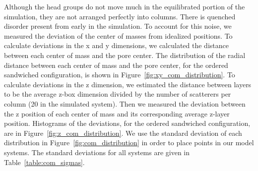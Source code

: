 \documentclass{article}
\begin{document}
  Although the head groups do not move much in the equilibrated portion of the
  simulation, they are not arranged perfectly into columns. There is quenched
  disorder present from early in the simulation. To account for this noise, we
  measured the deviation of the center of masses from idealized positions. To
  calculate deviations in the x and y dimensions, we calculated the distance
  between each center of mass and the pore center. The distribution of the radial
  distance between each center of mass and the pore center, for the ordered
  sandwiched configuration, is shown in Figure~\ref{fig:xy_com_distribution}. To
  calculate deviations in the z dimension, we estimated the distance between
  layers to be the average z-box dimension divided by the number of scatterers
  per column (20 in the simulated system). Then we measured the deviation between
  the z position of each center of mass and its corresponding average z-layer
  position. Histograms of the deviations, for the ordered sandwiched
  configuration, are in Figure~\ref{fig:z_com_distribution}. We use the standard
  deviation of each distribution in Figure~\ref{fig:com_distribution} in order to
  place points in our model systems. The standard deviations for all systems
  are given in Table~\ref{table:com_sigmas}.  
\end{document}
